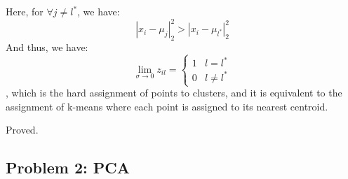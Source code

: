 \documentclass[11pt]{article}
\begin{document}
Here, for $\forall j \neq l^*$, we have:
\begin{equation}
  |x_i - \mu_j|_2^2 > |x_i - \mu_{l^*}|_2^2
\end{equation} 
And thus, we have:
\begin{equation}
  \lim_{\sigma \to 0} z_{il} = \begin{cases}
    1 & l = l^* \\
    0 & l \neq l^*
  \end{cases}
\end{equation}
, which is the hard assignment of points to clusters, and it is equivalent to the assignment of k-means where each point is assigned to its nearest centroid.

Proved.

\subsection*{\Large Problem 2: PCA}
\end{document}
